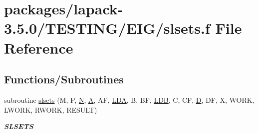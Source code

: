 \hypertarget{slsets_8f}{}\section{packages/lapack-\/3.5.0/\+T\+E\+S\+T\+I\+N\+G/\+E\+I\+G/slsets.f File Reference}
\label{slsets_8f}
\subsection*{Functions/\+Subroutines}
\begin{DoxyCompactItemize}
\item 
subroutine \hyperlink{group__single__eig_ga20ea4c39bd0bee5f869b9f9131c0c53d}{slsets} (M, P, \hyperlink{polmisc_8c_a0240ac851181b84ac374872dc5434ee4}{N}, \hyperlink{classA}{A}, A\+F, \hyperlink{example__user_8c_ae946da542ce0db94dced19b2ecefd1aa}{L\+D\+A}, B, B\+F, \hyperlink{example__user_8c_a50e90a7104df172b5a89a06c47fcca04}{L\+D\+B}, C, C\+F, \hyperlink{odrpack_8h_a7dae6ea403d00f3687f24a874e67d139}{D}, D\+F, X, W\+O\+R\+K, L\+W\+O\+R\+K, R\+W\+O\+R\+K, R\+E\+S\+U\+L\+T)
\begin{DoxyCompactList}\small\item\em {\bfseries S\+L\+S\+E\+T\+S} \end{DoxyCompactList}\end{DoxyCompactItemize}
